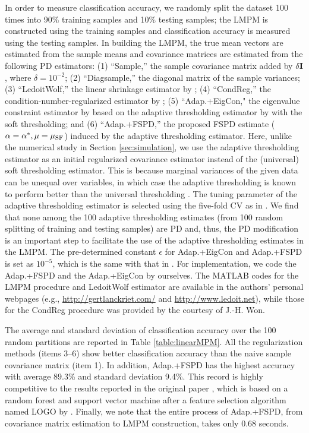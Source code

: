 \documentclass[times,sort&compress,3p]{elsarticle}
\begin{document}
\color{black}
In order to measure classification accuracy, we randomly split the dataset 100 times into 90\% training samples and 10\% testing samples;
the LMPM is
constructed using the training samples and classification accuracy is measured using the testing samples.
In building the LMPM, the true mean vectors are
estimated from the sample means and covariance matrices are estimated from the following PD estimators:
(1) ``Sample,'' the sample covariance matrix added by $\delta {\bf I}$, where $\delta = 10^{-2}$;
 (2) ``Diagsample,'' the diagonal matrix of the sample variances;
 (3) ``LedoitWolf,'' the linear shrinkage estimator by \citet{Ledoit2004};
 (4) ``CondReg,'' the condition-number-regularized estimator by \citet{Won2013};
 (5) ``Adap.+EigCon," the eigenvalue constraint estimator by \citet{Xue2012} based on the adaptive thresholding
 estimator by \citet{Cai2011b} with the soft thresholding;
 and (6) ``Adap.+FSPD,'' the proposed FSPD estimate ($\alpha=\alpha^*, \mu=\mu_{\rm SF}$) induced by the adaptive
 thresholding estimator. Here,
 unlike the numerical study in Section \ref{sec:simulation}, we use the adaptive thresholding estimator as an initial
 regularized covariance estimator
 instead of the (universal) soft thresholding estimator. This is because marginal variances of the given data can
 be unequal over variables, in which case the adaptive thresholding is known to perform better than the universal
 thresholding \citep{Cai2011b}. The tuning parameter of the adaptive thresholding estimator is selected using
 the five-fold CV as in \citet{Cai2011b}.  We find that none among the 100 adaptive thresholding 
 estimates (from 100 random splitting of training and testing samples) are PD and, thus, the PD modification 
 is an important step to  facilitate the use of the adaptive thresholding estimates in the LMPM.
 The pre-determined constant $\epsilon$ for Adap.+EigCon and Adap.+FSPD is
 set as  $10^{-5}$, which is the same with that in \citet{Xue2012}.  For implementation, we code the Adap.+FSPD and the Adap.+EigCon by ourselves. 
 The \textsf{MATLAB} codes for the LMPM procedure and LedoitWolf estimator are available in the authors' personal webpages (e.g., \url{http://gertlanckriet.com/} and \url{http://www.ledoit.net}), 
 while those for the CondReg procedure was provided by the courtesy of J.-H. Won.


The average and standard deviation of classification accuracy over the 100 random partitions are
 reported in Table \ref{table:linearMPM}. All the regularization methods (items 3--6) show
better classification accuracy than the naive sample covariance matrix (item 1). In addition, Adap.+FSPD has the highest
accuracy with
average 89.3\% and standard deviation 9.4\%. This record is highly competitive to the results
reported in the original paper
\citep{Tsanas2014}, which is based on a random forest and support vector machine after a feature selection algorithm named
LOGO by \citet{Sun2010}.
Finally, we note that the entire process of Adap.+FSPD, from covariance matrix estimation to LMPM construction, takes
only 0.68 seconds.
\end{document}
